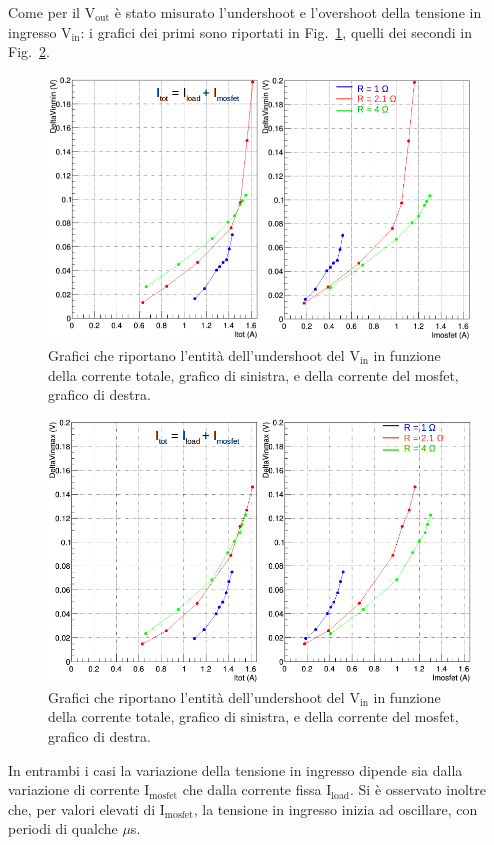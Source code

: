 Come per il $\mathrm{V_{out}}$ è stato misurato l'undershoot e l'overshoot della tensione in ingresso $\mathrm{V_{in}}$: i grafici dei primi sono riportati in Fig.~\ref{VinUnd}, quelli dei secondi in Fig.~\ref{VinOver}. 
\begin{figure}
\centering
\includegraphics[width=0.9\linewidth]{Immagini/VinUnd}
\caption{Grafici che riportano l'entità dell'undershoot del $\mathrm{V_{in}}$ in funzione della corrente totale, grafico di sinistra, e della corrente del mosfet, grafico di destra.}
\label{VinUnd}
\end{figure}
\begin{figure}
\centering
\includegraphics[width=0.9\linewidth]{Immagini/VinOver}
\caption{Grafici che riportano l'entità dell'undershoot del $\mathrm{V_{in}}$ in funzione della corrente totale, grafico di sinistra, e della corrente del mosfet, grafico di destra.}
\label{VinOver}
\end{figure}
In entrambi i casi la variazione della tensione in ingresso dipende sia dalla variazione di corrente $\mathrm{I_{mosfet}}$ che dalla corrente fissa $\mathrm{I_{load}}$. 
Si è osservato inoltre che, per valori elevati di $\mathrm{I_{mosfet}}$, la tensione in ingresso inizia ad oscillare, con periodi di qualche $\mu$s.
